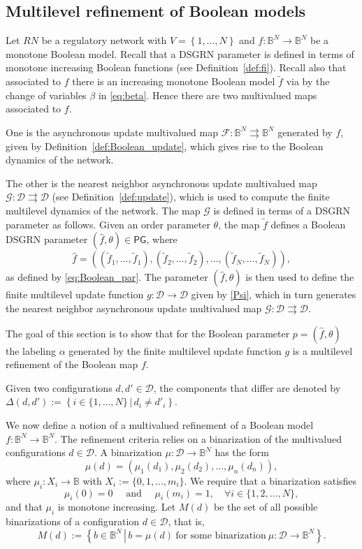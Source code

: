 \documentclass[12pt, notitlepage]{amsart}
\newcommand{\setof}[1]{\left\{ {#1}\right\}}
\newcommand{\setdef}[2]{\left\{{#1}\,\left|\,{#2}\right.\right\}}
\newcommand{\cD}{\mathcal{D}}
\newcommand{\cF}{{\mathcal F}}
\newcommand{\cG}{{\mathcal G}}
\theoremstyle{definition}
\newcommand{\PG}{\mathsf{PG}}
\newcommand{\bbB}{\mathbb{B}}
\newcommand{\Bernardo}[1]{{\color{teal}{{\bf Bernardo: }#1}}}
\begin{document}
  \subsection{Multilevel refinement of Boolean models}

  Let $RN$ be a regulatory network with $V = \setof{1, \ldots, N}$ and $f \colon \bbB^N \to \bbB^N$ be a monotone Boolean model. Recall that a DSGRN parameter is defined in terms of monotone increasing Boolean functions (see Definition~\ref{def:fi}). Recall also that associated to $f$ there is an increasing monotone Boolean model $\tilde{f}$ via by the change of variables $\beta$ in \eqref{eq:beta}. Hence there are two multivalued maps associated to $f$.

  One is the asynchronous update multivalued map $\cF \colon \bbB^N \rightrightarrows \bbB^N$ generated by $f$, given by Definition~\ref{def:Boolean_update}, which gives rise to the Boolean dynamics of the network.

  The other is the nearest neighbor asynchronous update multivalued map $\cG \colon \cD \rightrightarrows \cD$ (see Definition~\ref{def:update}), which is used to compute the finite multilevel dynamics of the network. The map $\cG$ is defined in terms of a DSGRN parameter as follows. Given an order parameter $\theta$, the map $\tilde{f}$ defines a Boolean DSGRN parameter $(\hat{f}, \theta) \in \PG$, where
  \[
    \hat{f} = \left( (\tilde{f}_1, \ldots, \tilde{f}_1), (\tilde{f}_2, \ldots, \tilde{f}_2), \ldots, (\tilde{f}_N, \ldots, \tilde{f}_N) \right),
  \]
  as defined by \eqref{eq:Boolean_par}. The parameter $(\hat{f}, \theta)$ is then used to define the finite multilevel update function $g \colon \cD \to \cD$ given by \eqref{Psi}, which in turn generates the nearest neighbor asynchronous update multivalued map $\cG \colon \cD \rightrightarrows \cD$.

  The goal of this section is to show that for the Boolean parameter $p = (\hat{f}, \theta)$ the labeling $\alpha$ generated by the finite multilevel update function $g$ is a multilevel refinement of the Boolean map $f$.

  Given two configurations $d, d' \in \cD$, the components that differ are denoted by $\Delta(d, d') := \setdef{i \in \{1, \ldots, N\} }{d_i\not = d'_i}$.

  We now define a notion of a multivalued refinement of a Boolean model $f \colon \bbB^N \to \bbB^N$. The refinement criteria relies on a binarization of the multivalued configurations $d \in \cD$. A binarization $\mu \colon \cD \to \bbB^N$ has the form
  \[
    \mu(d) = (\mu_1(d_1), \mu_2(d_2), \ldots, \mu_n(d_n)),
  \]
  where $\mu_i \colon X_i \to \bbB$ with $X_i := \{0, 1, \ldots, m_i\}$. We require that a binarization satisfies
  \[
    \mu_i(0) = 0 \quad \mbox{ and } \quad \mu_i(m_i)=1, \quad \forall i \in \{ 1, 2, \ldots, N\},
  \]
  and that $\mu_i$ is monotone increasing. Let  $M(d)$ be the set of all possible binarizations of a configuration $d \in \cD$, that is,
  \Bernardo{$M(k)$ is Morse node label}
  \[
    M(d) := \setdef{b \in \bbB^N}{b = \mu(d) ~\text{for some binarization}~ \mu \colon \cD \to \bbB^N}.
  \]
\end{document}
